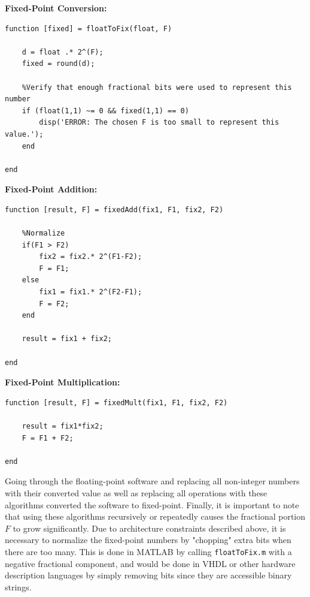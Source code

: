 \documentclass[12pt]{article} %
\begin{document}
\textbf{Fixed-Point Conversion:}
\begin{lstlisting}
function [fixed] = floatToFix(float, F)

    d = float .* 2^(F);
    fixed = round(d);

    %Verify that enough fractional bits were used to represent this number
    if (float(1,1) ~= 0 && fixed(1,1) == 0)
        disp('ERROR: The chosen F is too small to represent this value.');
    end

end
\end{lstlisting}
\textbf{Fixed-Point Addition:}
\begin{lstlisting}
function [result, F] = fixedAdd(fix1, F1, fix2, F2)

	%Normalize
    if(F1 > F2)
        fix2 = fix2.* 2^(F1-F2);
        F = F1;
    else
        fix1 = fix1.* 2^(F2-F1);
        F = F2;
    end

    result = fix1 + fix2;

end
\end{lstlisting}
\textbf{Fixed-Point Multiplication:}
\begin{lstlisting}
function [result, F] = fixedMult(fix1, F1, fix2, F2)

    result = fix1*fix2;
    F = F1 + F2;

end
\end{lstlisting}
Going through the floating-point software and replacing all non-integer numbers with their converted value as well as replacing all operations with these algorithms converted the software to fixed-point. Finally, it is important to note that using these algorithms recursively or repeatedly causes the fractional portion $F$ to grow significantly. Due to architecture constraints described above, it is necessary to normalize the fixed-point numbers by "chopping" extra bits when there are too many. This is done in MATLAB by calling \texttt{floatToFix.m} with a negative fractional component, and would be done in VHDL or other hardware description languages by simply removing bits since they are accessible binary strings.
\end{document}
